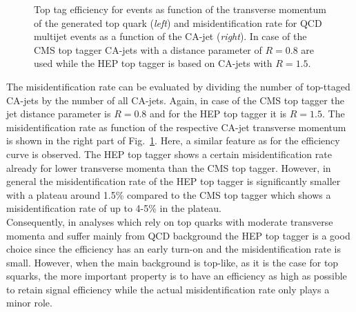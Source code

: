 \begin{description}
\begin{figure}[!t]
{\begin{tabular}{cc}
  \end{tabular}}
  \caption{Top tag efficiency for \ttbar events as function of the transverse momentum of the generated top quark (\textit{left}) and misidentification rate for QCD multijet events as a function of the CA-jet \pt (\textit{right}). In case of the CMS top tagger CA-jets with a distance parameter of $R=0.8$ are used while the HEP top tagger is based on CA-jets with $R=1.5$.}
  \label{fig:stop_top_eff}
\end{figure} 
The misidentification rate can be evaluated by dividing the number of top-ttaged CA-jets by the number of all CA-jets. Again, in case of the CMS top tagger the jet distance parameter is $R=0.8$ and for the HEP top tagger it is $R=1.5$. The misidentification rate as function of the respective CA-jet transverse momentum is shown in the right part of Fig.~\ref{fig:stop_top_eff}. Here, a similar feature as for the efficiency curve is observed. The HEP top tagger shows a certain misidentification rate already for lower transverse momenta than the CMS top tagger. However, in general the misidentification rate of the HEP top tagger is significantly smaller with a plateau around 1.5\% compared to the CMS top tagger which shows a misidentification rate of up to 4-5\% in the plateau. \\
Consequently, in analyses which rely on top quarks with moderate transverse momenta and suffer mainly from QCD background the HEP top tagger is a good choice since the efficiency has an early turn-on and the misidentification rate is small. However, when the main background is top-like, as it is the case for top squarks, the more important property is to have an efficiency as high as possible to retain signal efficiency while the actual misidentification rate only plays a minor role. 
\end{description}
